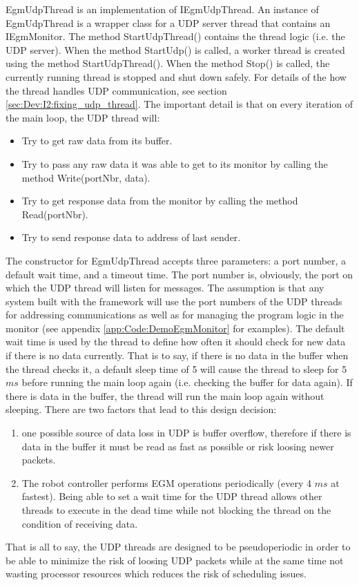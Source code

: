 \documentclass{cslthse-msc}
\begin{document}
EgmUdpThread is an implementation of IEgmUdpThread. An instance of EgmUdpThread is a wrapper class for a UDP server thread that contains an IEgmMonitor. The method StartUdpThread() contains the thread logic (i.e. the UDP server). When the method StartUdp() is called, a worker thread is created using the method StartUdpThread(). When the method Stop() is called, the currently running thread is stopped and shut down safely. For details of the how the thread handles UDP communication, see section \ref{sec:Dev:I2:fixing_udp_thread}. The important detail is that on every iteration of the main loop, the UDP thread will:
\begin{itemize}
    \item Try to get raw data from its buffer.
    \item Try to pass any raw data it was able to get to its monitor by calling the method Write(portNbr, data).
    \item Try to get response data from the monitor by calling the method Read(portNbr).
    \item Try to send response data to address of last sender.
\end{itemize}
The constructor for EgmUdpThread accepts three parameters: a port number, a default wait time, and a timeout time. The port number is, obviously, the port on which the UDP thread will listen for messages. The assumption is that any system built with the framework will use the port numbers of the UDP threads for addressing communications as well as for managing the program logic in the monitor (see appendix \ref{app:Code:DemoEgmMonitor} for examples). The default wait time is used by the thread to define how often it should check for new data if there is no data currently. That is to say, if there is no data in the buffer when the thread checks it, a default sleep time of 5 will cause the thread to sleep for 5 $ms$ before running the main loop again (i.e. checking the buffer for data again). If there is data in the buffer, the thread will run the main loop again without sleeping. There are two factors that lead to this design decision:
\begin{enumerate}
    \item one possible source of data loss in UDP is buffer overflow, therefore if there is data in the buffer it must be read as fast as possible or risk loosing newer packets.
    \item The robot controller performs EGM operations periodically (every 4 $ms$ at fastest). Being able to set a wait time for the UDP thread allows other threads to execute in the dead time while not blocking the thread on the condition of receiving data. 
\end{enumerate}
That is all to say, the UDP threads are designed to be pseudoperiodic in order to be able to minimize the risk of loosing UDP packets while at the same time not wasting processor resources which reduces the risk of scheduling issues. \par
\end{document}
